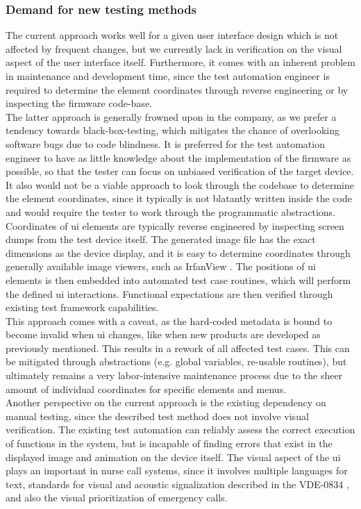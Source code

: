 \documentclass[Bachelor, BIC, english, fhCitStyle, IEEE]{BASE/twbook} %
\newcommand{\nocontentsline}[3]{}
\newcommand{\hidsubsubsection}[1]{\bgroup\let\addcontentsline=\nocontentsline\subsubsection{#1}\egroup}
\begin{document}
\newpage
\hidsubsubsection{Demand for new testing methods}
The current approach works well for a given user interface design which is not affected by frequent changes, but we currently lack in verification on the visual aspect of the user interface itself. Furthermore, it comes with an inherent problem in maintenance and development time, since the test automation engineer is required to determine the element coordinates through reverse engineering or by inspecting the firmware code-base.\\
The latter approach is generally frowned upon in the company, as we prefer a tendency towards black-box-testing, which mitigates the chance of overlooking software bugs due to code blindness. It is preferred for the test automation engineer to have as little knowledge about the implementation of the firmware as possible, so that the tester can focus on unbiased verification of the target device.
It also would not be a viable approach to look through the codebase to determine the element coordinates, since it typically is not blatantly written inside the code and would require the tester to work through the programmatic abstractions.
\\
Coordinates of \ac{ui} elements are typically reverse engineered by inspecting screen dumps from the test device itself. The generated image file has the exact dimensions as the device display, and it is easy to determine coordinates through generally available image viewers, such as IrfanView \autocite{IrfanViewOfficialHomepage}. The positions of \ac{ui} elements is then embedded into automated test case routines, which will perform the defined \ac{ui} interactions. Functional expectations are then verified through existing test framework capabilities.\\
This approach comes with a caveat, as the hard-coded metadata is bound to become invalid when \ac{ui} changes, like when new products are developed as previously mentioned. This results in a rework of all affected test cases. This can be mitigated through abstractions (e.g. global variables, re-usable routines), but ultimately remains a very labor-intensive maintenance process due to the sheer amount of individual coordinates for specific elements and menus.
\\
Another perspective on the current approach is the existing dependency on manual testing, since the described test method does not involve visual verification. The existing test automation can reliably assess the correct execution of functions in the system, but is incapable of finding errors that exist in the displayed image and animation on the device itself. The visual aspect of the \ac{ui} plays an important in nurse call systems, since it involves multiple languages for text, standards for visual and acoustic signalization described in the VDE-0834 \autocite{DINVDE08341}, and also the visual prioritization of emergency calls.
\end{document}
